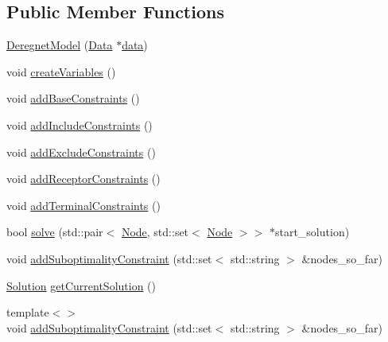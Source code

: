 \subsection*{Public Member Functions}
\begin{DoxyCompactItemize}
\item 
\hyperlink{classderegnet_1_1DeregnetModel_a218830114b0bd75965152c5c63a5f4d6}{Deregnet\+Model} (\hyperlink{avgdrgnt_8cpp_a1d1235306db276e9b36acba1db1509e8}{Data} $\ast$\hyperlink{classderegnet_1_1DeregnetModel_ad5399761cf6293a702f3800bda4806d1}{data})
\item 
void \hyperlink{classderegnet_1_1DeregnetModel_ae4dd4e4ae3e796c03d4390eeac1e0a96}{create\+Variables} ()
\item 
void \hyperlink{classderegnet_1_1DeregnetModel_ae246d2286429b83b32e727da987a5817}{add\+Base\+Constraints} ()
\item 
void \hyperlink{classderegnet_1_1DeregnetModel_a6970e42a055fa0dc871d6991ac0feab4}{add\+Include\+Constraints} ()
\item 
void \hyperlink{classderegnet_1_1DeregnetModel_a3b47185dcea73dbcad67d115c55ae762}{add\+Exclude\+Constraints} ()
\item 
void \hyperlink{classderegnet_1_1DeregnetModel_a6d8c05a79c11aefcf05bcdbf9f17aacb}{add\+Receptor\+Constraints} ()
\item 
void \hyperlink{classderegnet_1_1DeregnetModel_aee4a0d40a616c0e6e8787dcca08637aa}{add\+Terminal\+Constraints} ()
\item 
bool \hyperlink{classderegnet_1_1DeregnetModel_af8ca1da09f5a7ebe517fa62249d0b1ab}{solve} (std\+::pair$<$ \hyperlink{namespacederegnet_a744bad34f2de9856d36715a445f027f3}{Node}, std\+::set$<$ \hyperlink{namespacederegnet_a744bad34f2de9856d36715a445f027f3}{Node} $>$$>$ $\ast$start\+\_\+solution)
\item 
void \hyperlink{classderegnet_1_1DeregnetModel_a7cac8e5496b44f04ecf7ff9e450e9a6e}{add\+Suboptimality\+Constraint} (std\+::set$<$ std\+::string $>$ \&nodes\+\_\+so\+\_\+far)
\item 
\hyperlink{structderegnet_1_1Solution}{Solution} \hyperlink{classderegnet_1_1DeregnetModel_a51e1c5476b2425a143908609e75d098a}{get\+Current\+Solution} ()
\item 
{\footnotesize template$<$$>$ }\\void \hyperlink{classderegnet_1_1DeregnetModel_a37d1e4b40f89d3f198196863a8c1d321}{add\+Suboptimality\+Constraint} (std\+::set$<$ std\+::string $>$ \&nodes\+\_\+so\+\_\+far)
\item 
$$
\end{DoxyCompactItemize}

